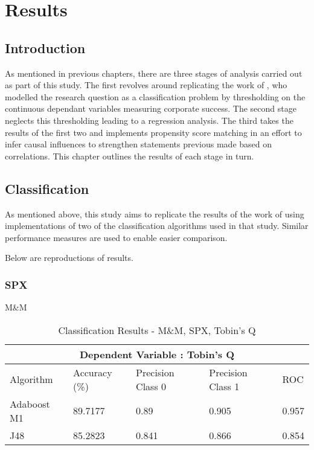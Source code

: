 %
%
%

\chapter{Results}\label{C.Results}

\section{Introduction}\label{S.intro4}
{As mentioned in previous chapters, there are three stages of analysis carried out as part of this study. The first revolves around replicating the work of \cite{moldovan2015learning}, who modelled the research question as a classification problem by thresholding on the continuous dependant variables measuring corporate success. The second stage neglects this thresholding leading to a regression analysis. The third takes the results of the first two and implements propensity score matching in an effort to infer causal influences to strengthen statements previous made based on correlations. This chapter outlines the results of each stage in turn.}
\section{Classification}\label{S.classification4}
{As mentioned above, this study aims to replicate the results of the work of \cite{moldovan2015learning} using implementations of two of the classification algorithms used in that study. Similar performance measures are used to enable easier comparison.}

{Below are reproductions of \cite{moldovan2015learning} results.}\\

\subsection*{SPX}
{M\&M}
\begin{table}[h!]
\centering
\begin{tabular}{ |p{2.5cm}||p{2.5cm}|p{2.5cm}|p{2.5cm}|p{1.5cm}|  }
 \hline
 \multicolumn{5}{|c|}{Dependent Variable : Tobin's Q} \\
 \hline
 Algorithm & Accuracy (\%) & Precision Class 0 & Precision Class 1 & ROC \\
 \hline
 Adaboost M1  &  89.7177     & 0.89 &  0.905 & 0.957  \\
 J48  & 85.2823  & 0.841 &  0.866 & 0.854  \\
 \hline
\end{tabular}
\caption{Classification Results - M\&M, SPX, Tobin's Q}
\end{table}


